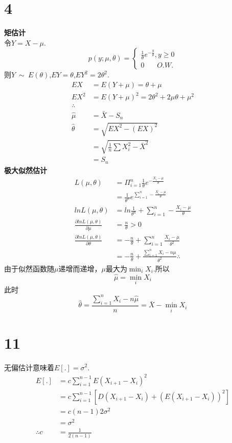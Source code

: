 \documentclass[a4paper,twocolumn]{ctexart}
\begin{document}
\section*{4}
\noindent\textbf{矩估计}\\
令$Y=X-\mu$.\\
\[
p(y;\mu,\theta)=\begin{cases}
\frac{1}{\theta}e^{-\frac{y}{\theta}},y\ge0\\
0~~~~~~~~O.W.
\end{cases}
\]
则$Y~\sim~E(\theta)$,$EY=\theta$,$EY^2=2\theta^2$.
\begin{align*}
EX&=E(Y+\mu)=\theta+\mu\\
EX^2&=E(Y+\mu)^2=2\theta^2+2\mu\theta+\mu^2\\
\therefore\\
\hat{\mu}&=\bar{X}-S_n\\
\hat{\theta}&=\sqrt{EX^2-(EX)^2}\\
&=\sqrt{\frac{1}{n}\sum X_i^2-\bar{X}^2}\\
&=S_n
\end{align*}
\noindent\textbf{极大似然估计}\\
\begin{align*}
L(\mu,\theta)&=\Pi_{i=1}^{n}\frac{1}{\theta}e^{-\frac{X_i-\mu}{\theta}}\\
&=\frac{1}{\theta^n}e^{\sum_{i=1}^{n}-\frac{X_i-\mu}{\theta}}\\
lnL(\mu,\theta)&=ln\frac{1}{\theta^n}+\sum_{i=1}^{n}-\frac{X_i-\mu}{\theta}\\
\frac{\partial lnL(\mu,\theta)}{\partial \mu}&=\frac{n}{\theta} >0\\
\frac{\partial lnL(\mu,\theta)}{\partial \theta}&=-\frac{n}{\theta}+\sum_{i=1}^{n}\frac{X_i-\mu}{\theta^2}\\
&=-\frac{n}{\theta}+\frac{\sum_{i=1}^{n}X_i-n\mu}{\theta^2}
\therefore
\end{align*}
由于似然函数随$\mu$递增而递增，$\mu$最大为$\min_{i}X_i$.所以
\[
\hat{\mu}=\min_{i}X_i
\]
此时
\[
\hat{\theta}=\frac{\sum_{i=1}^{n}X_i-n\hat\mu}{n}=\bar{X}-\min_{i}X_i
\]
\section*{11}
无偏估计意味着$E[.]=\sigma^2$.\\
\begin{align*}
E[.]&=c\sum_{i=1}^{n-1}E(X_{i+1}-X_i)^2\\
&=c\sum_{i=1}^{n-1}\left[D(X_{i+1}-X_i)+(E(X_{i+1}-X_i))^2\right]\\
&=c(n-1)2\sigma^2\\
&=\sigma^2\\
\therefore c&=\frac{1}{2(n-1)}
\end{align*}
\end{document}
